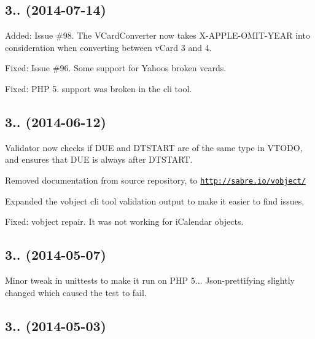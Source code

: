 \subsection*{3.. (2014-\/07-\/14) }


\begin{DoxyItemize}
\item Added\+: Issue \#98. The V\+Card\+Converter now takes {\ttfamily X-\/\+A\+P\+P\+L\+E-\/\+O\+M\+I\+T-\/\+Y\+E\+AR} into consideration when converting between v\+Card 3 and 4.
\item Fixed\+: Issue \#96. Some support for Yahoo\textquotesingle{}s broken vcards.
\item Fixed\+: P\+HP 5. support was broken in the cli tool.
\end{DoxyItemize}

\subsection*{3.. (2014-\/06-\/12) }


\begin{DoxyItemize}
\item Validator now checks if D\+UE and D\+T\+S\+T\+A\+RT are of the same type in V\+T\+O\+DO, and ensures that D\+UE is always after D\+T\+S\+T\+A\+RT.
\item Removed documentation from source repository, to \href{http://sabre.io/vobject/}{\tt http\+://sabre.\+io/vobject/}
\item Expanded the vobject cli tool validation output to make it easier to find issues.
\item Fixed\+: vobject repair. It was not working for i\+Calendar objects.
\end{DoxyItemize}

\subsection*{3.. (2014-\/05-\/07) }


\begin{DoxyItemize}
\item Minor tweak in unittests to make it run on P\+HP 5... Json-\/prettifying slightly changed which caused the test to fail.
\end{DoxyItemize}

\subsection*{3.. (2014-\/05-\/03) }


